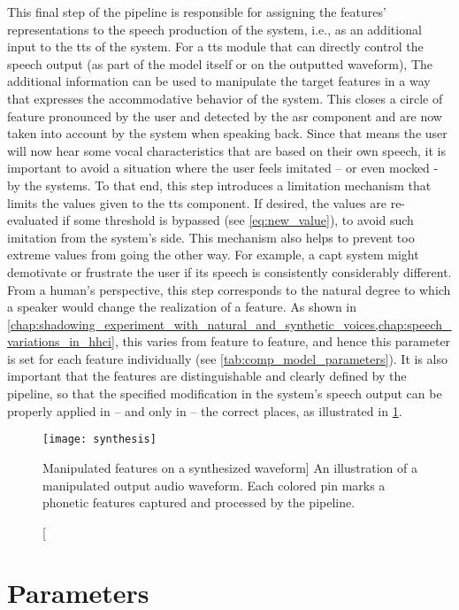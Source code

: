 This final step of the pipeline is responsible for assigning the features' representations to the speech production of the system, i.e., as an additional input to the \ac{tts} of the system.
For a \ac{tts} module that can directly control the speech output (as part of the model itself or on the outputted waveform),
The additional information can be used to manipulate the target features in a way that expresses the accommodative behavior of the system.
This closes a circle of feature pronounced by the user and detected by the \ac{asr} component and are now taken into account by the system when speaking back.
Since that means the user will now hear some vocal characteristics that are based on their own speech, it is important to avoid a situation where the user feels imitated -- or even mocked - by the systems.
To that end, this step introduces a limitation mechanism that limits the values given to the \ac{tts} component.
If desired, the values are re-evaluated if some threshold is bypassed (see \cref{eq:new_value}), to avoid such imitation from the system's side.
This mechanism also helps to prevent too extreme values from going the other way.
For example, a \ac{capt} system might demotivate or frustrate the user if its speech is consistently considerably different.
From a human's perspective, this step corresponds to the natural degree to which a speaker would change the realization of a feature.
As shown in \cref{chap:shadowing_experiment_with_natural_and_synthetic_voices,chap:speech_variations_in_hhci}, this varies from feature to feature, and hence this parameter is set for each feature individually (see \cref{tab:comp_model_parameters}).
It is also important that the features are distinguishable and clearly defined by the pipeline, so that the specified modification in the system's speech output can be properly applied in -- and only in -- the correct places, as illustrated in \cref{fig:adapted_synthesis_output}.
%
\begin{figure}
	\centering
	\texttt{[image: synthesis]}
	\caption
	[Manipulated features on a synthesized waveform]
	{An illustration of a manipulated output audio waveform.
		Each colored pin marks a phonetic features captured and processed by the pipeline.}
	\label{fig:adapted_synthesis_output}
\end{figure}

\section{Parameters}
\label{sec:parameters}

